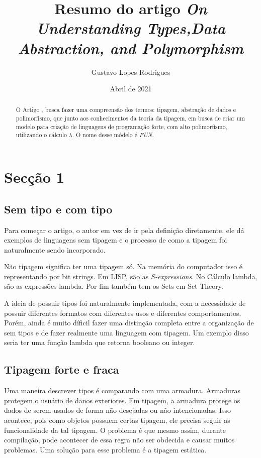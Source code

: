 \documentclass[12pt]{article}
\title{\textbf{Resumo do artigo \emph{On Understanding Types,Data Abstraction, and Polymorphism}}}
\author{Gustavo Lopes Rodrigues}
\date{Abril de 2021}
\begin{document}
    
    \maketitle

    \begin{abstract}
        O Artigo , busca fazer uma compreensão dos termos: tipagem, abstração de dados e polimorfismo, que junto aos 
        conhecimentos da teoria da tipagem, em busca de criar um modelo para criação de linguagens de programação forte, 
        com alto polimorfismo, utilizando o cálculo $\lambda$. O nome desse módelo é \emph{FUN}.
    \end{abstract}

    \section{Secção 1}
    \subsection{Sem tipo e com tipo}

        Para começar o artigo, o autor em vez de ir pela definição diretamente, ele 
        dá exemplos de linguagens sem tipagem e o processo de como a tipagem foi naturalmente
        sendo incorporado.

        Não tipagem significa ter uma tipagem só. Na memória do computador isso é representando por 
        bit strings. Em LISP, são as \emph{S-expressions}. No Cálculo lambda, são as expressões lambda. Por fim
        também tem os Sets em Set Theory. 

        A ideia de possuir tipos foi naturalmente implementada, com a necessidade de possuir diferentes 
        formatos com diferentes usos e diferentes comportamentos. Porém, ainda é muito díficil fazer uma distinção completa 
        entre a organização de sem tipos e de fazer realmente uma linguagem com tipagem. Um exemplo disso seria ter uma função 
        lambda que retorna booleano ou integer.

    \subsection{Tipagem forte e fraca}

        Uma maneira descrever tipos é comparando com uma armadura. Armaduras protegem o usuário de danos
        exteriores. Em tipagem, a armadura protege os dados de serem usados de forma não desejadas ou não
        intencionadas. Isso acontece, pois como objetos possuem certas tipagem, ele precisa seguir as 
        funcionalidade da tal tipagem. O problema é que mesmo assim, durante compilação, pode acontecer de
        essa regra não ser obdecida e causar muitos problemas. Uma solução para esse problema é a tipagem estática. 
        
\end{document}
